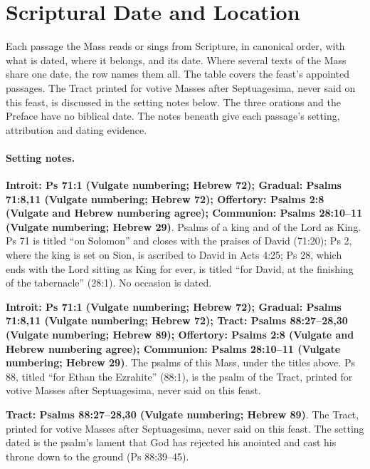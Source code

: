 \section{Scriptural Date and Location}
\label{sec:date-location}

{\small Each passage the Mass reads or sings from Scripture, in canonical
order, with what is dated, where it belongs, and its date. Where several texts
of the Mass share one date, the row names them all. The table covers the feast's
appointed passages. The Tract printed for votive Masses after Septuagesima,
never said on this feast, is discussed in the setting notes below.
The three orations and the Preface have no biblical
date. The notes beneath give each passage's setting, attribution and dating
evidence.\par}
\medskip



\paragraph{Setting notes.}
\noindent\textbf{Introit: Ps 71:1 (Vulgate numbering; Hebrew 72); Gradual: Psalms 71:8,11 (Vulgate numbering; Hebrew 72); Offertory: Psalms 2:8 (Vulgate and Hebrew numbering agree); Communion: Psalms 28:10--11 (Vulgate numbering; Hebrew 29)}. Psalms of a king and of the Lord as King. Ps 71 is titled ``on Solomon'' and closes with the praises of David (71:20); Ps 2, where the king is set on Sion, is ascribed to David in Acts 4:25; Ps 28, which ends with the Lord sitting as King for ever, is titled ``for David, at the finishing of the tabernacle'' (28:1). No occasion is dated.

\noindent\textbf{Introit: Ps 71:1 (Vulgate numbering; Hebrew 72); Gradual: Psalms 71:8,11 (Vulgate numbering; Hebrew 72); Tract: Psalms 88:27--28,30 (Vulgate numbering; Hebrew 89); Offertory: Psalms 2:8 (Vulgate and Hebrew numbering agree); Communion: Psalms 28:10--11 (Vulgate numbering; Hebrew 29)}. The psalms of this Mass, under the titles above. Ps 88, titled ``for Ethan the Ezrahite'' (88:1), is the psalm of the Tract, printed for votive Masses after Septuagesima, never said on this feast.

\noindent\textbf{Tract: Psalms 88:27--28,30 (Vulgate numbering; Hebrew 89)}. The Tract, printed for votive Masses after Septuagesima, never said on this feast. The setting dated is the psalm's lament that God has rejected his anointed and cast his throne down to the ground (Ps 88:39--45).

